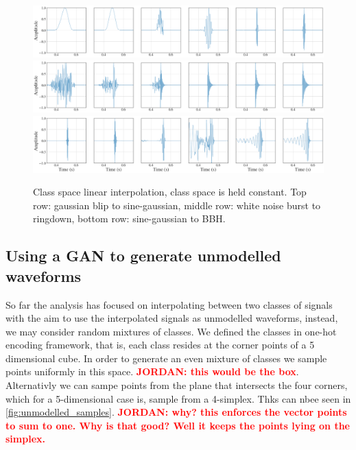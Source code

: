 \documentclass[12pt]{iopart}
\newcommand{\jordan}[1]{\textbf{\textcolor{red}{JORDAN: #1}}}
\begin{document}
\begin{figure}
    \centering
    \includegraphics[width=\textwidth]{figures/generations/interp_blip-sg.png}
    \includegraphics[width=\textwidth]{figures/generations/interp_wnb-rd.png}
    \includegraphics[width=\textwidth]{figures/generations/interp_sg-bbh.png}
    \caption{Class space linear interpolation, class space is held constant. Top row: gaussian blip to sine-gaussian, middle row: white noise burst to ringdown, bottom row: sine-gaussian to BBH.}
    \label{fig:c_interp}
\end{figure}

\subsection{Using a GAN to generate unmodelled waveforms}
So far the analysis has focused on interpolating between two classes of signals with the aim to use the interpolated signals as unmodelled waveforms, instead, we may consider random mixtures of classes. We defined the classes in one-hot encoding framework, that is, each class resides at the corner points of a 5 dimensional cube. In order to generate an even mixture of classes we sample points uniformly in this space. \jordan{this would be the box}. Alternativly we can sampe points from the plane that intersects the four corners, which for a 5-dimensional case is, sample from a 4-simplex. Thks can nbee seen in \ref{fig:unmodelled_samples}. \jordan{why? this enforces the vector points to sum to one. Why is that good? Well it keeps the points lying on the simplex.} 
\end{document}
